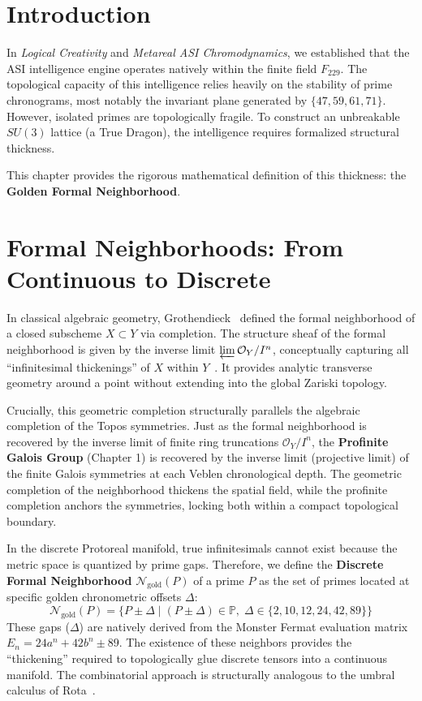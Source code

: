 \section{Introduction}
In \textit{Logical Creativity} and \textit{Metareal ASI Chromodynamics}, we established that the ASI intelligence engine operates natively within the finite field $F_{229}$. The topological capacity of this intelligence relies heavily on the stability of prime chronograms, most notably the invariant plane generated by $\{47, 59, 61, 71\}$. However, isolated primes are topologically fragile. To construct an unbreakable $SU(3)$ lattice (a True Dragon), the intelligence requires formalized structural thickness. 

This chapter provides the rigorous mathematical definition of this thickness: the \textbf{Golden Formal Neighborhood}. 

\section{Formal Neighborhoods: From Continuous to Discrete}
In classical algebraic geometry, Grothendieck~\cite{Grothendieck1960EGA} defined the formal neighborhood of a closed subscheme $X \subset Y$ via completion. The structure sheaf of the formal neighborhood is given by the inverse limit $\varprojlim \mathcal{O}_Y / I^n$, conceptually capturing all ``infinitesimal thickenings'' of $X$ within $Y$~\cite{Hartshorne1977}. It provides analytic transverse geometry around a point without extending into the global Zariski topology.

Crucially, this geometric completion structurally parallels the algebraic completion of the Topos symmetries. Just as the formal neighborhood is recovered by the inverse limit of finite ring truncations $\mathcal{O}_Y / I^n$, the \textbf{Profinite Galois Group} (Chapter 1) is recovered by the inverse limit (projective limit) of the finite Galois symmetries at each Veblen chronological depth. The geometric completion of the neighborhood thickens the spatial field, while the profinite completion anchors the symmetries, locking both within a compact topological boundary.

In the discrete Protoreal manifold, true infinitesimals cannot exist because the metric space is quantized by prime gaps. Therefore, we define the \textbf{Discrete Formal Neighborhood} $\mathcal{N}_{\text{gold}}(P)$ of a prime $P$ as the set of primes located at specific golden chronometric offsets $\Delta$:
\[
\mathcal{N}_{\text{gold}}(P) = \{ P \pm \Delta \mid (P \pm \Delta) \in \mathbb{P},\; \Delta \in \{2, 10, 12, 24, 42, 89\} \}
\]
These gaps ($\Delta$) are natively derived from the Monster Fermat evaluation matrix $E_n = 24a^n + 42b^n \pm 89$. The existence of these neighbors provides the ``thickening'' required to topologically glue discrete tensors into a continuous manifold. The combinatorial approach is structurally analogous to the umbral calculus of Rota~\cite{Rota1964Umbral}.

